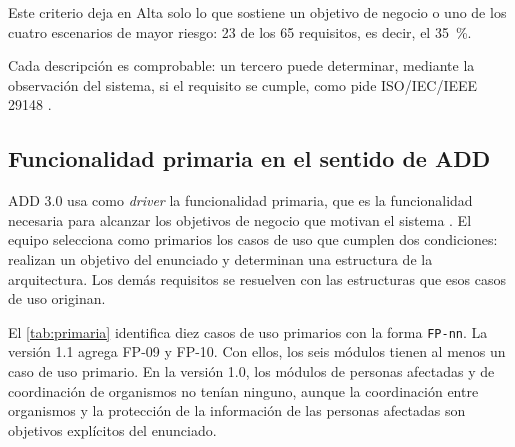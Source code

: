 \documentclass[11pt,letterpaper]{article}
\begin{document}
Este criterio deja en Alta solo lo que sostiene un objetivo de negocio o uno de los cuatro escenarios
de mayor riesgo: 23 de los 65 requisitos, es decir, el \qty{35}{\percent}.

Cada descripción es comprobable: un tercero puede determinar, mediante la observación del sistema,
si el requisito se cumple, como pide ISO/IEC/IEEE 29148 \cite{iso29148}.

\subsection{Funcionalidad primaria en el sentido de ADD}
\label{sec:primaria}

ADD 3.0 usa como \emph{driver} la funcionalidad primaria, que es la funcionalidad necesaria para
alcanzar los objetivos de negocio que motivan el sistema \cite{cervantes}. El equipo selecciona como
primarios los casos de uso que cumplen dos condiciones: realizan un objetivo del enunciado y
determinan una estructura de la arquitectura. Los demás requisitos se resuelven con las estructuras
que esos casos de uso originan.

El \cref{tab:primaria} identifica diez casos de uso primarios con la forma \texttt{FP-nn}. La versión
1.1 agrega FP-09 y FP-10. Con ellos, los seis módulos tienen al menos un caso de uso primario. En
la versión 1.0, los módulos de personas afectadas y de coordinación de organismos no tenían
ninguno, aunque la coordinación entre organismos y la protección de la información de las personas
afectadas son objetivos explícitos del enunciado.
\end{document}
